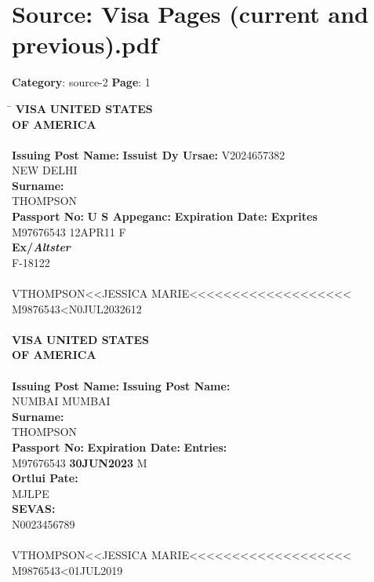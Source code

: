 \section*{Source: Visa Pages (current and previous).pdf}
\textbf{Category}: source-2
\textbf{Page}: 1

\begin{tabbing}
\hspace{3cm} \= \kill
\textbf{VISA} \hspace{5cm} \textbf{UNITED STATES}\\
\> \textbf{OF AMERICA} \\
\\
\textbf{Issuing Post Name:} \> \textbf{Issuist Dy Ursae:} \hspace{1cm} V2024657382 \\
NEW DELHI \\
\textbf{Surname:} \> \\
THOMPSON \\
\textbf{Passport No:} \> \textbf{U S Appeganc:} \> \textbf{Expiration Date:} \> \textbf{Exprites} \\
M97676543 \> 12APR11 \> F \\
\textbf{Ex/\textit{Altster}} \\
F-18122 \\
\\
VTHOMPSON\textless\textless JESSICA MARIE\textless\textless\textless\textless\textless\textless\textless\textless\textless\textless\textless\textless\textless\textless\textless\textless\textless\textless\textless \\
M9876543\textless N0JUL2032612 \\
\\
\textbf{VISA} \hspace{5cm} \textbf{UNITED STATES}\\
\> \textbf{OF AMERICA} \\
\\
\textbf{Issuing Post Name:} \> \textbf{Issuing Post Name:} \\
NUMBAI \> MUMBAI \\
\textbf{Surname:} \> \\
THOMPSON \\
\textbf{Passport No:} \> \textbf{Expiration Date:} \> \textbf{Entries:} \\
M97676543 \> \textbf{30JUN2023} \> M \\
\textbf{Ortlui Pate:} \\
MJLPE \\
\textbf{SEVAS:} \\
N0023456789 \\
\\
VTHOMPSON\textless\textless JESSICA MARIE\textless\textless\textless\textless\textless\textless\textless\textless\textless\textless\textless\textless\textless\textless\textless\textless\textless\textless\textless \\
M9876543\textless 01JUL2019
\end{tabbing}